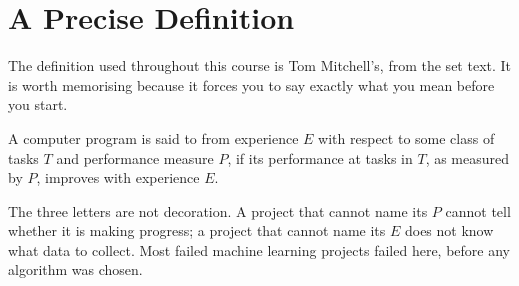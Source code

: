 \section{A Precise Definition}

The definition used throughout this course is Tom Mitchell's, from the set text.
It is worth memorising because it forces you to say exactly what you mean before
you start.

\begin{definitionbox}
A computer program is said to  from experience $E$ with respect to
some class of tasks $T$ and performance measure $P$, if its performance at tasks
in $T$, as measured by $P$, improves with experience $E$.
\end{definitionbox}

The three letters are not decoration. A project that cannot name its $P$ cannot
tell whether it is making progress; a project that cannot name its $E$ does not
know what data to collect. Most failed machine learning projects failed here,
before any algorithm was chosen.

